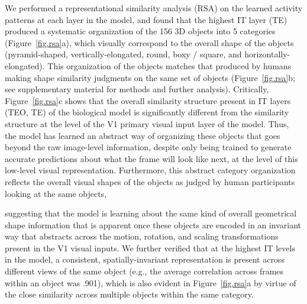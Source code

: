 \documentclass[12pt,twoside]{article}
\newif\myifpdf
\begin{document}
We performed a representational similarity analysis (RSA) on the learned activity patterns at each layer in the model, and found that the highest IT layer (TE) produced a systematic organization of the 156 3D objects into 5 categories (Figure~\ref{fig.rsa}a), which visually correspond to the overall shape of the objects (pyramid-shaped, vertically-elongated, round, boxy / square, and horizontally-elongated). This organization of the objects matches that produced by humans making shape similarity judgments on the same set of objects (Figure~\ref{fig.rsa}b; see supplementary material for methods and further analysis).  Critically, Figure~\ref{fig.rsa}c shows that the overall similarity structure present in IT layers (TEO, TE) of the biological model is significantly different from the similarity structure at the level of the V1 primary visual input layer of the model.  Thus, the model has learned an abstract way of organizing these objects that goes beyond the raw image-level information, despite only being trained to generate accurate predictions about what the frame will look like next, at the level of this low-level visual representation.  Furthermore, this abstract category organization reflects the overall visual shapes of the objects as judged by human participants looking at the same objects,

suggesting that the model is learning about the same kind of overall geometrical shape information that is apparent once these objects are encoded in an invariant way that abstracts across the motion, rotation, and scaling transformations present in the V1 visual inputs.  We further verified that at the highest IT levels in the model, a consistent, spatially-invariant representation is present across different views of the same object (e.g., the average correlation across frames within an object was .901), which is also evident in Figure~\ref{fig.rsa}a by virtue of the close similarity across multiple objects within the same category.
\end{document}
